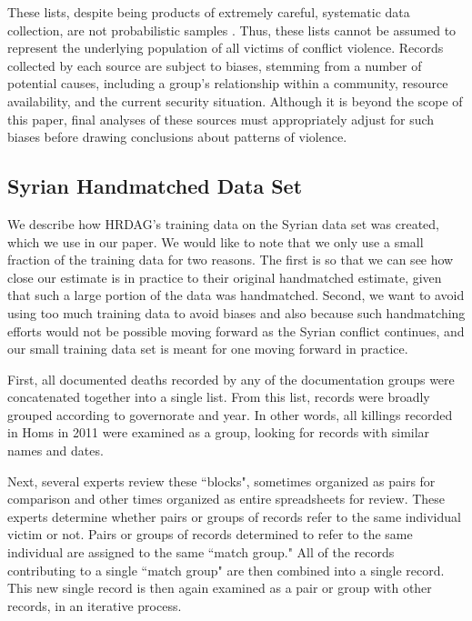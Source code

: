 \documentclass{imsart}
\begin{document}
These lists, despite being products of extremely careful, systematic data collection, are not probabilistic samples \citep{Sig2015, IOAS2015, CJLS2015, price2014updated}. Thus, these lists cannot be assumed to represent the underlying population of all victims of conflict violence.  Records collected by each source are subject to biases, stemming from a number of potential causes, including a group's relationship within a community, resource availability, and the current security situation.  Although it is beyond the scope of this paper, final analyses of these sources must appropriately adjust for such biases before drawing conclusions about patterns of violence.

\subsection{Syrian Handmatched Data Set}
\label{app:hand}
We describe how HRDAG's training data on the Syrian data set was created, which we use in our paper. We would like to note that we only use a small fraction of the training data for two reasons. The first is so that we can see how close our estimate is in practice to their original handmatched estimate, given that such a large portion of the data was handmatched. Second, we want to avoid using too much training data to avoid biases and also because such handmatching efforts would not be possible moving forward as the Syrian conflict continues, and our small training data set is meant for one moving forward in practice.

First, all documented deaths recorded by any of the documentation groups were concatenated together into a single list. From this list, records were broadly grouped according to governorate and year. In other words, all killings recorded in Homs in 2011 were examined as a group, looking for records with similar names and dates.

Next, several experts review these ``blocks", sometimes organized as pairs for comparison and other times organized as entire spreadsheets for review.  These experts determine whether pairs or groups of records refer to the same individual victim or not. Pairs or groups of records determined to refer to the same individual are assigned to the same ``match group." All of the records contributing to a single ``match group" are then combined into a single record. This new single record is then again examined as a pair or group with other records, in an iterative process.
\end{document}
